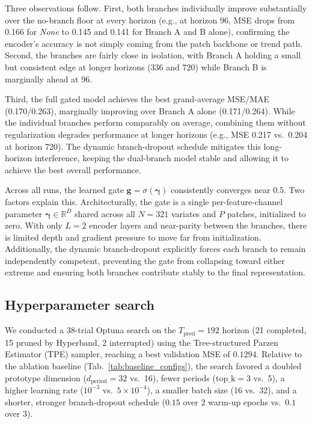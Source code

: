 \documentclass[10pt,journal]{IEEEtran}
\newcommand{\tab}[1]{Tab.~\ref{#1}}
\begin{document}
Three observations follow. First, both branches individually improve substantially over the no-branch floor at every horizon (e.g., at horizon 96, MSE drops from 0.166 for \emph{None} to 0.145 and 0.141 for Branch A and B alone), confirming the encoder's accuracy is not simply coming from the patch backbone or trend path. Second, the branches are fairly close in isolation, with Branch A holding a small but consistent edge at longer horizons (336 and 720) while Branch B is marginally ahead at 96.

Third, the full gated model achieves the best grand-average MSE/MAE (0.170/0.263), marginally improving over Branch A alone (0.171/0.264). While the individual branches perform comparably on average, combining them without regularization degrades performance at longer horizons (e.g., MSE 0.217 vs.\ 0.204 at horizon 720). The dynamic branch-dropout schedule mitigates this long-horizon interference, keeping the dual-branch model stable and allowing it to achieve the best overall performance.

Across all runs, the learned gate $\bm{g} = \sigma(\bm{\gamma})$ consistently converges near $0.5$. Two factors explain this. Architecturally, the gate is a single per-feature-channel parameter $\bm{\gamma} \in \mathbb{R}^{D}$ shared across all $N = 321$ variates and $P$ patches, initialized to zero. With only $L = 2$ encoder layers and near-parity between the branches, there is limited depth and gradient pressure to move far from initialization. Additionally, the dynamic branch-dropout explicitly forces each branch to remain independently competent, preventing the gate from collapsing toward either extreme and ensuring both branches contribute stably to the final representation.

\subsection{Hyperparameter search}
\label{sec:hp}

We conducted a 38-trial Optuna search on the $T_{\mathrm{pred}} = 192$ horizon (21 completed, 15 pruned by Hyperband, 2 interrupted) using the Tree-structured Parzen Estimator (TPE) sampler, reaching a best validation MSE of $0.1294$. Relative to the ablation baseline (\tab{tab:baseline_configs}), the search favored a doubled prototype dimension ($d_{\mathrm{period}} = 32$ vs.\ 16), fewer periods ($\mathrm{top\_k} = 3$ vs.\ 5), a higher learning rate ($10^{-3}$ vs.\ $5\!\times\!10^{-4}$), a smaller batch size (16 vs.\ 32), and a shorter, stronger branch-dropout schedule ($0.15$ over $2$ warm-up epochs vs.\ $0.1$ over $3$).
\end{document}
